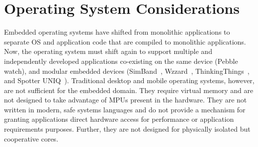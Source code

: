\section{Operating System Considerations}
\label{os-considerations}

Embedded operating systems have shifted from monolithic applications to
separate OS and application code that are compiled to monolithic applications.
Now, the operating system must shift again to support
multiple and independently
developed applications co-existing on the same device (Pebble~\cite{pebble} watch),
and modular embedded devices
(SimBand~\cite{simband}, Wzzard~\cite{wzzard}, ThinkingThings~\cite{thinkingthings}, and Spotter UNIQ~\cite{spotteruniq}).
Traditional desktop and mobile operating systems, however, are not sufficient
for the embedded domain. They require virtual memory and are not designed to
take advantage of MPUs present in the hardware. They are not written in
modern, safe systems languages and do not provide a mechanism for granting
applications direct hardware access for performance or application requirements
purposes. Further, they are not designed for physically isolated but cooperative
cores.




